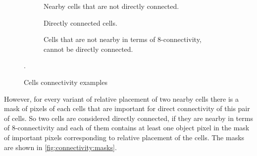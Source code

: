 \documentclass[hidelinks]{llncs}
\newcommand{\texten}[1]{#1}
\newcommand{\textru}[1]{}
\begin{document}
\begin{figure}
  \centering
  \begin{subfigure}[t]{0.3\linewidth}
    \centering
    \caption{Nearby cells that are not directly connected.}
  \end{subfigure}
  \quad
  \begin{subfigure}[t]{0.3\linewidth}
    \centering
    \caption{Directly connected cells.}
  \end{subfigure}
  \quad
  \begin{subfigure}[t]{0.3\linewidth}
    \centering
    \caption{Cells that are not nearby in terms of 8-connectivity, cannot be
    directly connected.}
  \end{subfigure}
  \caption{Cells connectivity examples}
  \label{fig:connectivity:examples}.
\end{figure}

\texten{
However, for every variant of relative placement of two nearby cells there is
a mask of pixels of each cells that are important for direct connectivity of
this pair of cells.
So two cells are considered directly connected, if they are nearby
in terms of 8-connectivity and each of them contains at least one object pixel
in the mask of important pixels corresponding to relative placement of the cells.
The masks are shown in \autoref{fig:connectivity:masks}.
}\textru{
Тем не менее, можно заметить, что анализировать можно не все биты цвета, а только
некоторую маску тех бит, которые важны для связности двух конкретных клеток.
Эти маски показаны на \autoref{fig:connectivity:masks}.
}
\end{document}
